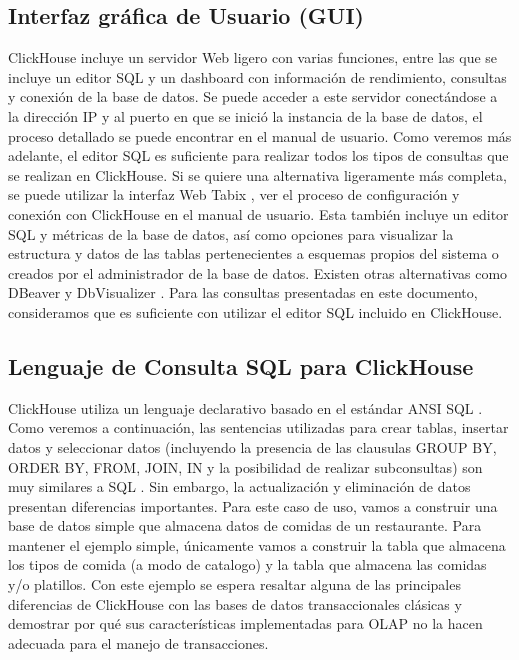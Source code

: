 \subsection{Interfaz gráfica de Usuario (GUI)}
ClickHouse incluye un servidor Web ligero con varias funciones, entre las que se incluye un editor SQL y un dashboard con información de rendimiento, consultas y conexión de la base de datos. Se puede acceder a este servidor conectándose a la dirección IP y al puerto en que se inició la instancia de la base de datos, el proceso detallado se puede encontrar en el manual de usuario. Como veremos más adelante, el editor SQL es suficiente para realizar todos los tipos de consultas que se realizan en ClickHouse. Si se quiere una alternativa ligeramente más completa, se puede utilizar la interfaz Web Tabix \parencite{tabix_docker}, ver el proceso de configuración y conexión con ClickHouse en el manual de usuario. Esta también incluye un editor SQL y métricas de la base de datos, así como opciones para visualizar la estructura y datos de las tablas pertenecientes a esquemas propios del sistema o creados por el administrador de la base de datos. Existen otras alternativas como DBeaver \parencite{clickhouse_dbeaver} y DbVisualizer \parencite{clickhouse_dbvisualizer}. Para las consultas presentadas en este documento, consideramos que es suficiente con utilizar el editor SQL incluido en ClickHouse. 

\subsection{Lenguaje de Consulta SQL para ClickHouse}
ClickHouse utiliza un lenguaje declarativo basado en el estándar ANSI SQL \parencite{clickhouse_sql_reference}. Como veremos a continuación, las sentencias utilizadas para crear tablas, insertar datos y seleccionar datos (incluyendo la presencia de las clausulas GROUP BY, ORDER BY, FROM, JOIN, IN y la posibilidad de realizar subconsultas) son muy similares a SQL \parencite{clickhouse_sql_reference}. Sin embargo, la actualización y eliminación de datos presentan diferencias importantes. Para este caso de uso, vamos a construir una base de datos simple que almacena datos de comidas de un restaurante. Para mantener el ejemplo simple, únicamente vamos a construir la tabla que almacena los tipos de comida (a modo de catalogo) y la tabla que almacena las comidas y/o platillos. Con este ejemplo se espera resaltar alguna de las principales diferencias de ClickHouse con las bases de datos transaccionales clásicas y demostrar por qué sus características implementadas para OLAP no la hacen adecuada para el manejo de transacciones. 


